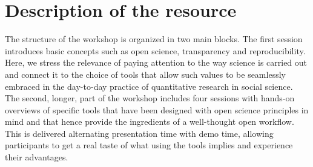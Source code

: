 \documentclass[scrartcl,a4paper,utopia,10pt]{article}
\begin{document}
\section{Description of the resource}
\label{sec-2}

The structure of the workshop is organized in two main blocks. The first session introduces basic concepts such as open science, transparency and reproducibility. Here, we stress the relevance of paying attention to the way science is carried out and connect it to the choice of tools that allow such values to be seamlessly embraced in the day-to-day practice of quantitative research in social science. The second, longer, part of the workshop includes four sessions with hands-on overviews of specific tools that have been designed with open science principles in mind and that hence provide the ingredients of a well-thought open workflow. This is delivered alternating presentation time with demo time, allowing participants to get a real taste of what using the tools implies and experience their advantages. 
\end{document}
